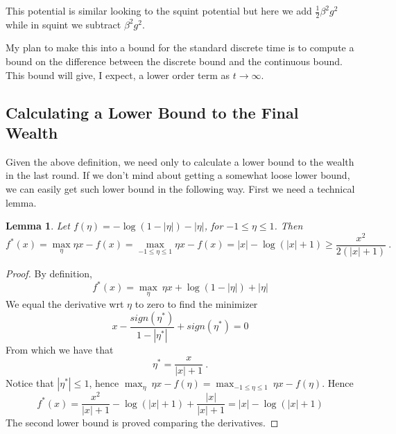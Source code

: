 \documentclass{article}
\newtheorem{lemma}{Lemma}
\begin{document}
This potential is similar looking to the squint potential but here we add $\frac{1}{2}\beta^2g^2$ while in squint we subtract $\beta^2 g^2$.

My plan to make this into a bound for the standard discrete time is to compute a bound on the difference between the discrete bound and the continuous bound. This bound will give, I expect, a lower order term as $t \to \infty$.
\fi

\subsection{Calculating a Lower Bound to the Final Wealth}
Given the above definition, we need only to calculate a lower bound to the wealth in the last round. If we don't mind about getting a somewhat loose lower bound, we can easily get such lower bound in the following way.
First we need a technical lemma.
\begin{lemma}
\label{lemma:l1}
Let $f(\eta)=-\log(1-|\eta|)-|\eta|$, for $-1 \leq \eta\leq 1 $. Then 
\[
f^*(x)=\max_\eta \eta x - f(x) = \max_{-1\leq \eta\leq 1} \eta x - f(x) = |x|-\log(|x|+1)\geq \frac{x^2}{2(|x|+1)}~.
\]
\end{lemma}
%
\begin{proof}
By definition,
\[
f^*(x)=\max_{\eta} \ \eta x + \log(1-|\eta|)+|\eta|
\]
We equal the derivative wrt $\eta$ to zero to find the minimizer
\[
x-\frac{sign(\eta^*)}{1-|\eta^*|}+sign(\eta^*)=0
\]
From which we have that
\[
\eta^*=\frac{x}{|x|+1}~.
\]
Notice that $|\eta^*|\leq 1$, hence $\max_{\eta} \ \eta x -f(\eta) = \max_{-1\leq \eta \leq 1} \ \eta x -f(\eta)$.
Hence
\[
f^*(x)= \frac{x^2}{|x|+1} - \log(|x|+1)+\frac{|x|}{|x|+1} = |x|-\log(|x|+1)
\]
The second lower bound is proved comparing the derivatives.
\end{proof}
\end{document}

